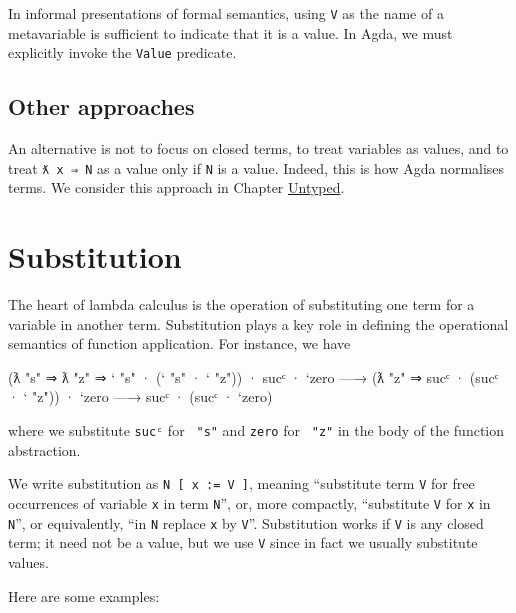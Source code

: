 In informal presentations of formal semantics, using \texttt{V} as the
name of a metavariable is sufficient to indicate that it is a value. In
Agda, we must explicitly invoke the \texttt{Value} predicate.

\hypertarget{other-approaches}{%
\subsection{Other approaches}\label{other-approaches}}

An alternative is not to focus on closed terms, to treat variables as
values, and to treat \texttt{ƛ\ x\ ⇒\ N} as a value only if \texttt{N}
is a value. Indeed, this is how Agda normalises terms. We consider this
approach in Chapter \protect\hyperlink{Untyped}{Untyped}.

\hypertarget{substitution}{%
\section{Substitution}\label{substitution}}

The heart of lambda calculus is the operation of substituting one term
for a variable in another term. Substitution plays a key role in
defining the operational semantics of function application. For
instance, we have

\begin{myDisplay}
  (ƛ "s" ⇒ ƛ "z" ⇒ ` "s" · (` "s" · ` "z")) · sucᶜ · `zero
—→
  (ƛ "z" ⇒ sucᶜ · (sucᶜ · ` "z")) · `zero
—→
  sucᶜ · (sucᶜ · `zero)
\end{myDisplay}

where we substitute \texttt{sucᶜ} for \texttt{\textasciigrave{}\ "s"}
and \texttt{\textasciigrave{}zero} for \texttt{\textasciigrave{}\ "z"}
in the body of the function abstraction.

We write substitution as \texttt{N\ {[}\ x\ :=\ V\ {]}}, meaning
``substitute term \texttt{V} for free occurrences of variable \texttt{x}
in term \texttt{N}'', or, more compactly, ``substitute \texttt{V} for
\texttt{x} in \texttt{N}'', or equivalently, ``in \texttt{N} replace
\texttt{x} by \texttt{V}''. Substitution works if \texttt{V} is any
closed term; it need not be a value, but we use \texttt{V} since in fact
we usually substitute values.

Here are some examples:

